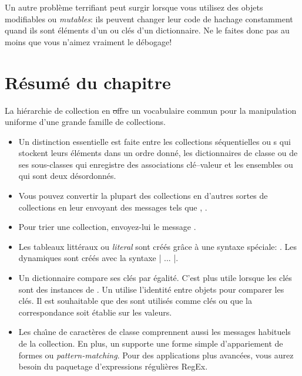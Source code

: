 \documentclass[a4paper,10pt,twoside]{book}
\begin{document}
Un autre probl\`eme terrifiant peut surgir lorsque vous utilisez des
objets modifiables ou \emph{mutables}: ils peuvent changer leur
code de hachage constamment quand ils sont \'el\'ements d'un 
ou cl\'es d'un dictionnaire. 
Ne le faites donc pas au moins que vous n'aimez vraiment le d\'ebogage!

\section{R\'esum\'e du chapitre}

La hi\'erarchie de collection en \st offre un vocabulaire commun pour la manipulation uniforme d'une grande famille de collections.

\begin{itemize}
  \item Un distinction essentielle est faite entre les collections s\'equentielles ou 
s qui stockent leurs \'el\'ements dans un ordre
donn\'e, 
les dictionnaires de classe ou de ses sous-classes qui
enregistre des associations cl\'e--valeur et les ensembles 
 ou  qui sont deux d\'esordonn\'es.
  \item Vous pouvez convertir la plupart des collections en d'autres sortes de 
collections en leur envoyant des messages tels que ,  \etc.
  \item Pour trier une collection, envoyez-lui le message .
  \item Les tableaux litt\'eraux ou \emph{literal}  sont cr\'e\'es 
gr\^ace \`a une syntaxe sp\'eciale: .  Les  dynamiques
sont cr\'e\'es avec la syntaxe \ct|{ ... }|.
  \item Un dictionnaire  compare ses cl\'es par \'egalit\'e.
C'est plus utile lorsque les cl\'es sont des instances de . 
Un  utilise l'identit\'e entre objets pour comparer les cl\'es. Il est souhaitable que des  sont utilis\'es comme cl\'es ou que la correspondance soit \'etablie sur les valeurs.
  \item Les cha\^{\i}ne de caract\`eres de classe  comprennent
aussi les messages habituels de la collection. En plus, un  
supporte une forme simple d'appariement de formes ou \emph{pattern-matching}. 
Pour des applications plus avanc\'ees, vous aurez besoin du paquetage d'expressions r\'eguli\`eres RegEx.

\end{itemize}
\end{document}
